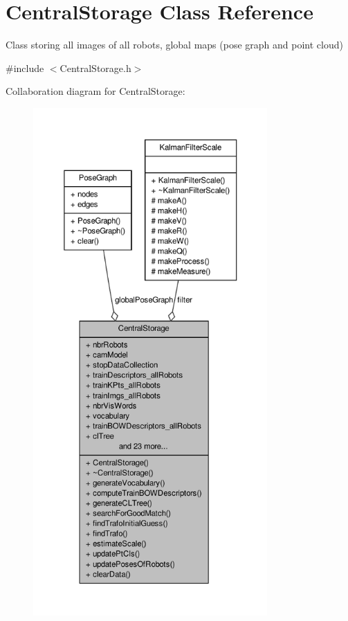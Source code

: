 \hypertarget{classCentralStorage}{\section{\-Central\-Storage \-Class \-Reference}
\label{classCentralStorage}
}


\-Class storing all images of all robots, global maps (pose graph and point cloud)  




{\ttfamily \#include $<$\-Central\-Storage.\-h$>$}



\-Collaboration diagram for \-Central\-Storage\-:\nopagebreak
\begin{figure}[H]
\begin{center}
\leavevmode
\includegraphics[height=550pt]{classCentralStorage__coll__graph}
\end{center}
\end{figure}
